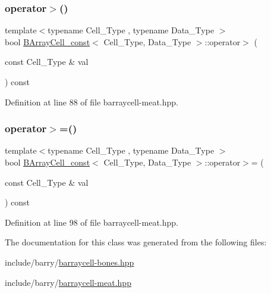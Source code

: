\subsubsection{\texorpdfstring{operator$>$()}{operator>()}}
{\footnotesize\ttfamily template$<$typename Cell\+\_\+\+Type , typename Data\+\_\+\+Type $>$ \\
bool \hyperlink{class_b_array_cell__const}{B\+Array\+Cell\+\_\+const}$<$ Cell\+\_\+\+Type, Data\+\_\+\+Type $>$\+::operator$>$ (\begin{DoxyParamCaption}\item[{const Cell\+\_\+\+Type \&}]{val }\end{DoxyParamCaption}) const\hspace{0.3cm}{\ttfamily [inline]}}



Definition at line 88 of file barraycell-\/meat.\+hpp.

\mbox{\label{class_b_array_cell__const_af402da27396466b677cf4bcce94af6ed}} 
\subsubsection{\texorpdfstring{operator$>$=()}{operator>=()}}
{\footnotesize\ttfamily template$<$typename Cell\+\_\+\+Type , typename Data\+\_\+\+Type $>$ \\
bool \hyperlink{class_b_array_cell__const}{B\+Array\+Cell\+\_\+const}$<$ Cell\+\_\+\+Type, Data\+\_\+\+Type $>$\+::operator$>$= (\begin{DoxyParamCaption}\item[{const Cell\+\_\+\+Type \&}]{val }\end{DoxyParamCaption}) const\hspace{0.3cm}{\ttfamily [inline]}}



Definition at line 98 of file barraycell-\/meat.\+hpp.



The documentation for this class was generated from the following files\+:\begin{DoxyCompactItemize}
\item 
include/barry/\hyperlink{barraycell-bones_8hpp}{barraycell-\/bones.\+hpp}\item 
include/barry/\hyperlink{barraycell-meat_8hpp}{barraycell-\/meat.\+hpp}\end{DoxyCompactItemize}
